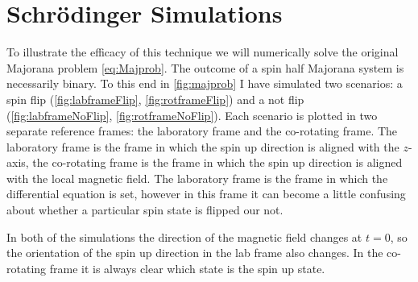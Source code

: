 \section{Schr\"odinger Simulations}

To illustrate the efficacy of this technique we will numerically solve the original Majorana problem \autoref{eq:Majprob}.
The outcome of a spin half Majorana system is necessarily binary.
To this end in \autoref{fig:majprob} I have simulated two scenarios: a spin flip (\autoref{fig:labframeFlip}, \autoref{fig:rotframeFlip}) and a not flip (\autoref{fig:labframeNoFlip}, \autoref{fig:rotframeNoFlip}).
Each scenario is plotted in two separate reference frames: the laboratory frame and the co-rotating frame.
The laboratory frame is the frame in which the spin up direction is aligned with the $z$-axis, the co-rotating frame is the frame in which the spin up direction is aligned with the local magnetic field.
The laboratory frame is the frame in which the differential equation is set, however in this frame it can become a little confusing about whether a particular spin state is flipped our not.

In both of the simulations the direction of the magnetic field changes at $t=0$, so the orientation of the spin up direction in the lab frame also changes.
In the co-rotating frame it is always clear which state is the spin up state.

